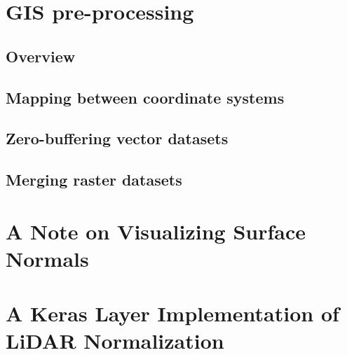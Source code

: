 \appendix
\chapter{GIS pre-processing}

\vspace{-2em}
\section{Overview}%
\label{app:preprocessing-overview}%


\section{Mapping between coordinate systems}%
\label{app:srid-change}


\section{Zero-buffering vector datasets}%
\label{app:zero-buffer}


\section{Merging raster datasets}%
\label{app:raster-merging}


\chapter{A Note on Visualizing Surface Normals}%
\label{app:normal-visualization}


\chapter{A Keras Layer Implementation of LiDAR Normalization}%
\label{app:lidar-normalization}

